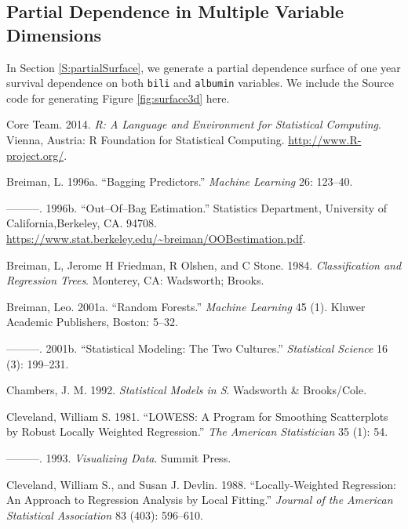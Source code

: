 \documentclass[article]{jss}
\begin{document}
\subsection{Partial Dependence in Multiple Variable
Dimensions}\label{partial-dependence-in-multiple-variable-dimensions}

In Section \ref{S:partialSurface}, we generate a partial dependence
surface of one year survival dependence on both \texttt{bili} and
\texttt{albumin} variables. We include the Source code for generating
Figure \ref{fig:surface3d} here.

\hypertarget{refs}{}
\hypertarget{ref-rcore}{}
 Core Team. 2014. \emph{R: A Language and Environment for
Statistical Computing}. Vienna, Austria: R Foundation for Statistical
Computing. \url{http://www.R-project.org/}.

\hypertarget{ref-Breiman:1996}{}
Breiman, L. 1996a. ``Bagging Predictors.'' \emph{Machine Learning} 26:
123--40.

\hypertarget{ref-BreimanOOB:1996e}{}
---------. 1996b. ``Out--Of--Bag Estimation.'' Statistics Department,
University of California,Berkeley, CA. 94708.
\url{https://www.stat.berkeley.edu/~breiman/OOBestimation.pdf}.

\hypertarget{ref-cart:1984}{}
Breiman, L, Jerome H Friedman, R Olshen, and C Stone. 1984.
\emph{Classification and Regression Trees}. Monterey, CA: Wadsworth;
Brooks.

\hypertarget{ref-Breiman:2001}{}
Breiman, Leo. 2001a. ``Random Forests.'' \emph{Machine Learning} 45 (1).
Kluwer Academic Publishers, Boston: 5--32.

\hypertarget{ref-Breiman:twoCultures:2001}{}
---------. 2001b. ``Statistical Modeling: The Two Cultures.''
\emph{Statistical Science} 16 (3): 199--231.

\hypertarget{ref-chambers:1992}{}
Chambers, J. M. 1992. \emph{Statistical Models in S}. Wadsworth \&
Brooks/Cole.

\hypertarget{ref-cleveland:1981}{}
Cleveland, William S. 1981. ``LOWESS: A Program for Smoothing
Scatterplots by Robust Locally Weighted Regression.'' \emph{The American
Statistician} 35 (1): 54.

\hypertarget{ref-cleveland:1993}{}
---------. 1993. \emph{Visualizing Data}. Summit Press.

\hypertarget{ref-cleveland:1988}{}
Cleveland, William S., and Susan J. Devlin. 1988. ``Locally-Weighted
Regression: An Approach to Regression Analysis by Local Fitting.''
\emph{Journal of the American Statistical Association} 83 (403):
596--610.
\end{document}
